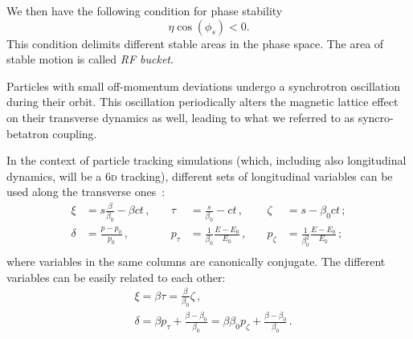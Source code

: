 We then have the following condition for phase stability
\begin{equation}
    \eta \cos \left(\phi_s\right)<0 .
\end{equation}
This condition delimits different stable areas in the phase space. The area of stable motion is called \textit{RF bucket}. %

Particles with small off-momentum deviations undergo a synchrotron oscillation during their orbit. This oscillation periodically alters the magnetic lattice effect on their transverse dynamics as well, leading to what we referred to as syncro-betatron coupling.

In the context of particle tracking simulations (which, including also longitudinal dynamics, will be a 6\textsc{d} tracking), different sets of longitudinal variables can be used along the transverse ones~\cite{xsuite:physics}:
\begin{equation}
    \begin{aligned}
    \xi &= s \frac{\beta}{\beta_0}-\beta c t \,,\quad& \tau &= \frac{s}{\beta_0}-c t \,,\quad& \zeta &= s-\beta_0 c t \,;\\
    \delta &= \frac{p-p_0}{p_0} \,,\quad& p_\tau &= \frac{1}{\beta_0} \frac{E-E_0}{E_0} \,,\quad& p_\zeta &= \frac{1}{\beta_0^2} \frac{E-E_0}{E_0}\,; \\
    \end{aligned}
\end{equation}
where variables in the same columns are canonically conjugate.
The different variables can be easily related to each other:
\begin{equation}
    \begin{aligned}
    &\xi=\beta \tau=\frac{\beta}{\beta_0} \zeta \,,\\
    &\delta=\beta p_\tau+\frac{\beta-\beta_0}{\beta_0}=\beta \beta_0 p_\zeta+\frac{\beta-\beta_0}{\beta_0} \,.
    \end{aligned}
\end{equation}

\parseparator
